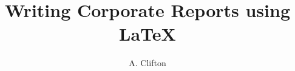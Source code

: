 \documentclass[a4paper,logo,tagged]{CorporateReport}
\title{Writing Corporate Reports using LaTeX}
\author{A. Clifton}
\begin{document}
\frontmatter

\clearpage
\tableofcontents
\listoffigures
\listoftables

\mainmatter






\label{sec:TheBibliography}
\printbibliography

\appendix


\end{document}
